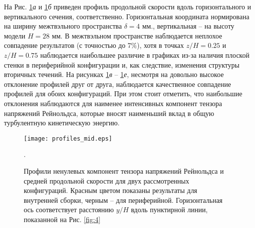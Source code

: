 %
%
%
На Рис. \ref{fig:5}\textit{а} и \ref{fig:5}\textit{б} приведен профиль продольной скорости вдоль горизонтального и вертикального сечения, соответственно.
%
Горизонтальная координата нормирована на ширину межтвэльного пространства $\delta = 4$ мм., вертикальная -- на высоту модели $H = 28$ мм.
%
В межтвэльном пространстве наблюдается неплохое совпадение результатов (с точностью до 7\%), хотя в точках $z/H = 0.25$ и $z/H = 0.75$ наблюдается наибольшее различие в графиках из-за наличия плоской стенки в периферийной конфигурации и, как следствие, изменения структуры вторичных течений.
%
На рисунках \ref{fig:5}\textit{в} -- \ref{fig:5}\textit{е}, несмотря на довольно высокое отклонение профилей друг от друга, наблюдается качественное совпадение профилей для обоих конфигураций.
%
При этом стоит отметить, что наибольшие отклонения наблюдаются для наименее интенсивных компонент тензора напряжений Рейнольдса, которые вносят наименьший вклад в общую турбулентную кинетическую энергию.


%
%
\begin{figure}[h!]
  \centering
  \texttt{[image: profiles\_mid.eps]}
  \caption{Профили ненулевых компонент тензора напряжений Рейнольдса и средней продольной скорости для двух рассмотренных конфигураций. Красным цветом показаны результаты для внутренней сборки, черным -- для периферийной. Горизонтальная ось соответствует расстоянию $y/H$ вдоль пунктирной линии, показанной на Рис. \ref{fig:4}}.
  \label{fig:5}
\end{figure}





